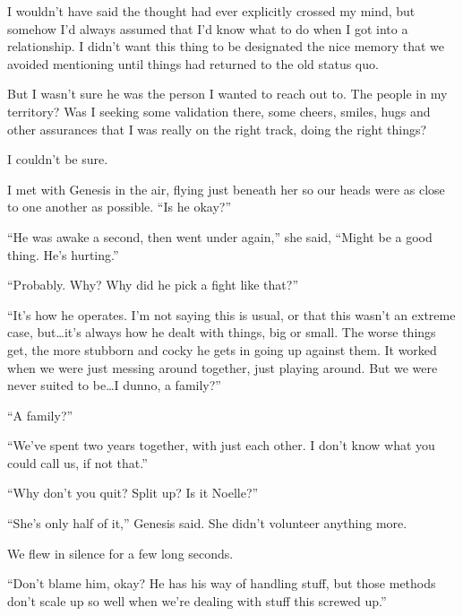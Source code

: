 I wouldn't have said the thought had ever explicitly crossed my mind, but somehow I'd always assumed that I'd know what to do when I got into a relationship.  I didn't want this thing to be designated the nice memory that we avoided mentioning until things had returned to the old status quo.



But I wasn't sure he was the person I wanted to reach out to.  The people in my territory?  Was I seeking some validation there, some cheers, smiles, hugs and other assurances that I was really on the right track, doing the right things?



I couldn't be sure.



I met with Genesis in the air, flying just beneath her so our heads were as close to one another as possible.  ``Is he okay?''



``He was awake a second, then went under again,'' she said, ``Might be a good thing.  He's hurting.''



``Probably.  Why?  Why did he pick a fight like that?''



``It's how he operates.  I'm not saying this is usual, or that this wasn't an extreme case, but\ldots it's always how he dealt with things, big or small.  The worse things get, the more stubborn and cocky he gets in going up against them.  It worked when we were just messing around together, just playing around.  But we were never suited to be\ldots I dunno, a family?''



``A family?''



``We've spent two years together, with just each other.  I don't know what you could call us, if not that.''



``Why don't you quit?  Split up?  Is it Noelle?''



``She's only half of it,'' Genesis said.  She didn't volunteer anything more.



We flew in silence for a few long seconds.



``Don't blame him, okay?  He has his way of handling stuff, but those methods don't scale up so well when we're dealing with stuff this screwed up.''



